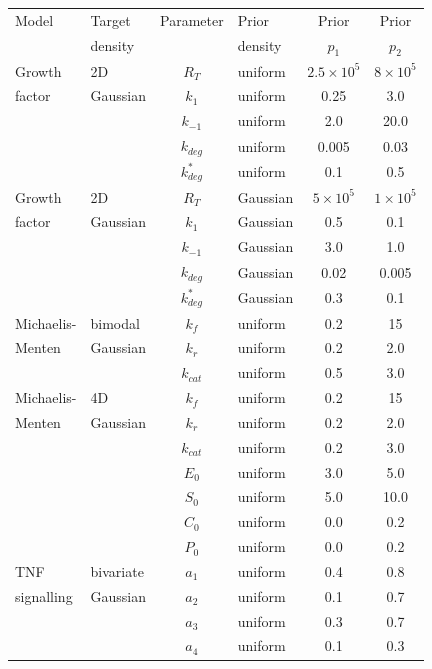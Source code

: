 \begin{table}[H]
\centering
\begin{adjustwidth}{0in}{0in}%
\begin{tabularx}{1.0\textwidth}{llclcc}
Model	& Target  & Parameter & Prior    & Prior  & Prior  \\
        & density &           & density  & $p_1$  & $p_2$  \\
\toprule
Growth  & 2D     & $R_T$       & uniform & $2.5 \times 10^5$ &  $8 \times 10^5$\\
factor  & Gaussian & $k_1$       & uniform & 0.25 & 3.0\\
                && $k_{-1}$    & uniform & 2.0 & 20.0\\
                && $k_{deg}$   & uniform & 0.005 & 0.03\\
                && $k^*_{deg}$ & uniform & 0.1 & 0.5\\
\toprule
Growth  & 2D     & $R_T$ & Gaussian & $5 \times 10^5$ &  $1 \times 10^5$\\
factor  & Gaussian & $k_1$ & Gaussian & 0.5 & 0.1\\
                && $k_{-1}$ & Gaussian & 3.0 & 1.0\\
                && $k_{deg}$ & Gaussian & 0.02 & 0.005\\
                && $k^*_{deg}$ & Gaussian & 0.3 & 0.1\\
\toprule
Michaelis- & bimodal  & $k_f$ & uniform & 0.2 &  15\\
Menten     & Gaussian   & $k_r$ & uniform & 0.2 & 2.0\\
&& $k_{cat}$ & uniform & 0.5 & 3.0\\
\toprule
Michaelis- & 4D    & $k_f$ & uniform & 0.2 &  15\\
Menten     & Gaussian& $k_r$ & uniform & 0.2 & 2.0\\
&& $k_{cat}$ & uniform & 0.2 & 3.0\\
&& $E_0$ & uniform & 3.0 & 5.0\\
&& $S_0$ & uniform & 5.0 & 10.0\\
&& $C_0$ & uniform & 0.0 & 0.2\\
&& $P_0$ & uniform & 0.0 & 0.2\\
\toprule
TNF & bivariate & $a_1$ & uniform & 0.4 & 0.8\\
signalling & Gaussian& $a_2$ & uniform & 0.1 & 0.7\\
&& $a_3$ & uniform & 0.3 & 0.7\\
&& $a_4$ & uniform & 0.1 & 0.3\\

\end{tabularx}
\end{adjustwidth}
\end{table}
